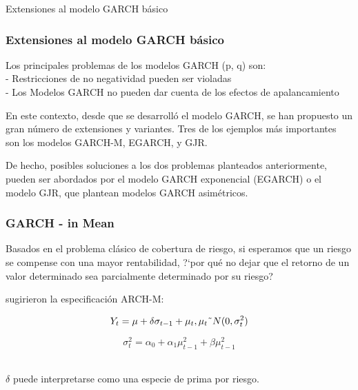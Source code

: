 \documentclass[xcolor=(list of options)]{beamer}
\begin{document}
\begin{section}{Extensiones al modelo GARCH b\'asico}
\begin{frame}
\frametitle{Extensiones al modelo GARCH b\'asico}

Los principales problemas de los modelos GARCH (p, q) son:\\
- Restricciones de no negatividad pueden ser violadas\\
- Los Modelos GARCH no pueden dar cuenta de los efectos de apalancamiento\\
\vspace{2mm}	

En este contexto, desde que se desarroll\'o el modelo GARCH, se han propuesto un gran n\'umero de extensiones y variantes. Tres de los ejemplos m\'as importantes son los modelos GARCH-M, EGARCH, y GJR. \\
\vspace{2mm}	

De hecho, posibles soluciones a los dos problemas planteados anteriormente, pueden ser abordados por el modelo GARCH exponencial (EGARCH) o el modelo GJR, que plantean modelos GARCH asim\'etricos. 

\end{frame}

\begin{frame}
\frametitle{GARCH - in Mean}

Basados en el problema cl\'asico de cobertura de riesgo, si esperamos que un riesgo se compense con una mayor rentabilidad, ?`por qu\'e no dejar que el retorno de un valor determinado sea parcialmente determinado por su riesgo?
\vspace{2mm}	

\cite{engle1987estimating} sugirieron la especificaci\'on ARCH-M:

\begin{equation}
Y_t = \mu + \delta \sigma_{t-1} + \mu_t , \mu_t \string~N(0,\sigma^2_t)
\end{equation}

\begin{equation}
\sigma^2_t = \alpha_0 + \alpha_1 \mu^2_{t-1} + \beta \mu^2_{t-1}
\end{equation} 

$\delta$ puede interpretarse como una especie de prima por riesgo.


\end{frame}
\end{section}
\end{document}
